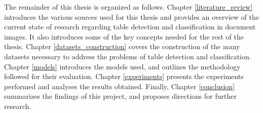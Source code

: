 The remainder of this thesis is organized as follows. Chapter \ref{literature_review} introduces the various sources used for this thesis and provides an overview of the current state of research regarding table detection and classification in document images. It also introduces some of the key concepts needed for the rest of the thesis. Chapter \ref{datasets_construction} covers the construction of the many datasets necessary to address the problems of table detection and classification. Chapter \ref{models} introduces the models used, and outlines the methodology followed for their evaluation. Chapter \ref{experiments} presents the experiments performed and analyses the results obtained. Finally, Chapter \ref{conclusion} summarizes the findings of this project, and proposes directions for further research.